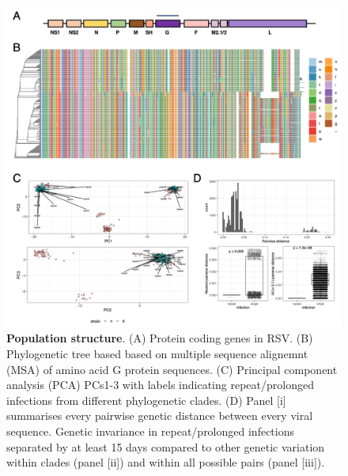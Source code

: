 \documentclass{article} %
\begin{document}
\begin{figure}[ht] \hspace{-0.5cm} 
    \includegraphics[scale=0.8]{f2}
	\caption{\textbf{Population structure}.
(A) Protein coding genes in RSV.
(B) Phylogenetic tree based based on multiple sequence alignemnt (MSA) of amino acid G protein sequences.
(C) Principal component analysis (PCA) PCs1-3 with labels indicating repeat/prolonged infections from different phylogenetic clades.
(D) Panel [i] summarises every pairwise genetic distance between every viral sequence.
Genetic invariance in repeat/prolonged infections separated by at least 15 days compared to other genetic variation within clades  
(panel [ii]) and within all possible pairs (panel [iii]).}
	\label{fig:2} 
\end{figure}
\clearpage
\end{document}
